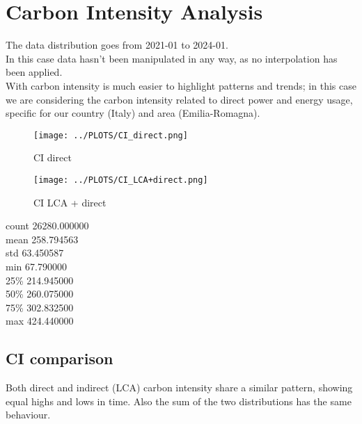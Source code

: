 \section{Carbon Intensity Analysis}
The data distribution goes from 2021-01 to 2024-01. \\
In this case data hasn’t been manipulated in any way, as no interpolation has been applied. \\
With carbon intensity is much easier to highlight patterns and trends; in this case we are considering the carbon intensity related to direct power and energy usage, specific for our country (Italy) and area (Emilia-Romagna).

\vspace{-15pt}

\begin{figure}[H]
\centering
\texttt{[image: ../PLOTS/CI\_direct.png]}
\captionsetup{skip=-10pt}
\caption{CI direct}
\label{fig:CI_direct}
\end{figure}

\vspace{-20pt}

\begin{figure}[H]
\centering
\texttt{[image: ../PLOTS/CI\_LCA+direct.png]}
\captionsetup{skip=-10pt}
\caption{CI LCA + direct}
\label{CI_LCA+direct}
\end{figure}

\begin{center}
count    26280.000000 \\
mean       258.794563 \\
std         63.450587 \\
min         67.790000 \\
25\%        214.945000 \\
50\%        260.075000 \\
75\%        302.832500 \\
max        424.440000
\end{center}

\subsection{CI comparison}
Both direct and indirect (LCA) carbon intensity share a similar pattern, showing equal highs and lows in time. Also the sum of the two distributions has the same behaviour.  

\vspace{-15pt}

